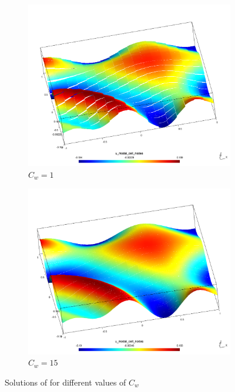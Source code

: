 \begin{figure}[h!]
	\centering
	\begin{subfigure}{.5\textwidth}	
		\centering	
		\includegraphics[width=\linewidth]{../figs/sols/0_1_0_0_0_0_0_0_0_sol-h256o02}
		\caption{$C_w = 1$}
	\end{subfigure}%
	\begin{subfigure}{.5\textwidth}
		\centering	
		\includegraphics[width=\linewidth]{../figs/sols/2_1_2_0_0_0_0_0_0_sol-h256o02}
		\caption{$C_w = 15$}
	\end{subfigure}
	\caption{Solutions of  for different values of $C_w$}
	\label{fig:sol_kucera}
\end{figure}

